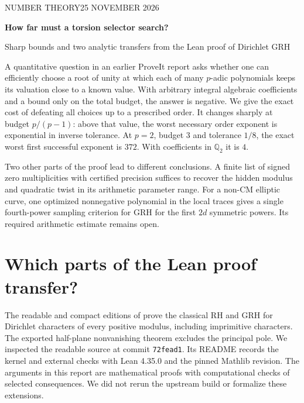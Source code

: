 \documentclass[11pt]{article}
\begin{document}
\raggedbottom
\thispagestyle{plain}
{\small\sffamily\color{accent}NUMBER THEORY\hfill 25 NOVEMBER 2026}\par\vspace{12pt}
{\noindent\fontsize{24}{28}\selectfont\bfseries\sffamily\color{ink}How far must a torsion selector search?\par}
\vspace{4pt}
{\noindent\large\sffamily Sharp bounds and two analytic transfers from the Lean proof of Dirichlet GRH\par}
\vspace{9pt}\noindent{\color{accent}\rule{\linewidth}{.7pt}}\par\vspace{5pt}
\noindent A quantitative question in an earlier ProveIt report asks whether one can efficiently choose a root of unity at which each of many $p$-adic polynomials keeps its valuation close to a known value. With arbitrary integral algebraic coefficients and a bound only on the total budget, the answer is negative. We give the exact cost of defeating all choices up to a prescribed order. It changes sharply at budget $p/(p-1)$: above that value, the worst necessary order exponent is exponential in inverse tolerance. At $p=2$, budget $3$ and tolerance $1/8$, the exact worst first successful exponent is $372$. With coefficients in $\mathbb Q_2$ it is $4$.

\medskip\noindent Two other parts of the proof lead to different conclusions. A finite list of signed zero multiplicities with certified precision suffices to recover the hidden modulus and quadratic twist in its arithmetic parameter range. For a non-CM elliptic curve, one optimized nonnegative polynomial in the local traces gives a single fourth-power sampling criterion for GRH for the first $2d$ symmetric powers. Its required arithmetic estimate remains open.

\section{Which parts of the Lean proof transfer?}
The readable and compact editions of \cite{repo} prove the classical RH and GRH for Dirichlet characters of every positive modulus, including imprimitive characters. The exported half-plane nonvanishing theorem excludes the principal pole. We inspected the readable source at commit \texttt{72fead1}. Its README records the kernel and external checks with Lean 4.35.0 and the pinned Mathlib revision. The arguments in this report are mathematical proofs with computational checks of selected consequences. We did not rerun the upstream build or formalize these extensions.
\end{document}
